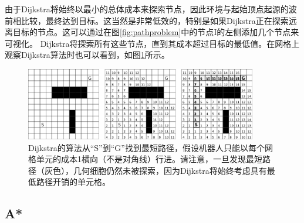 由于Dijkstra将始终以最小的总体成本来探索节点，因此环境与起始顶点起源的波前相比较，最终达到目标。这当然是非常低效的，特别是如果Dijkstra正在探索远离目标的节点。这可以通过在图\ref{fig:pathproblem}中的节点I的左侧添加几个节点来可视化。 Dijkstra将探索所有这些节点，直到其成本超过目标的最低值。在网格上观察Dijkstra算法时也可以看到，如图\ref{fig:dijkstragrid}所示。


\begin{figure}[htb]
\centering
\includegraphics[width=0.9\textwidth]{figs/dijkstragrid}
\caption{Dijkstra的算法从“S”到“G”找到最短路径，假设机器人只能以每个网格单元的成本1横向（不是对角线）行进。请注意，一旦发现最短路径（灰色），几何细胞仍然未被探索，因为Dijkstra将始终考虑具有最低路径开销的单元格。 \label{fig:dijkstragrid}}
\end{figure}

\subsection{A*}\label{sec:astar}

